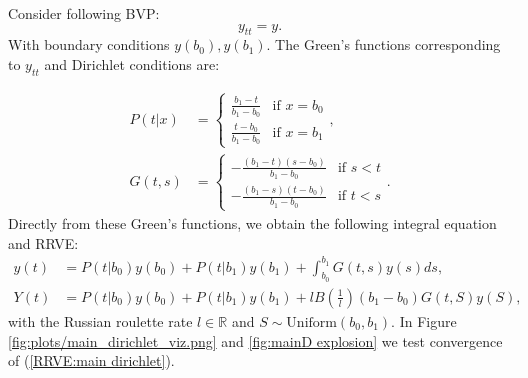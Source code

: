 \documentclass[a4paper,12pt]{article}
\begin{document}
\begin{example}[Dirichlet $y_{tt}=y$] \label{main dirichlet}
  Consider following BVP:
  \begin{equation} \label{eq:main dirichlet}
    y_{tt}=y.
  \end{equation}
  With boundary conditions $y(b_{0}),y(b_{1})$. The Green's functions corresponding to $y_{tt}$ and Dirichlet conditions are:

  \begin{align}
    P(t|x) & = \begin{cases}
                 \frac{b_{1}-t}{b_{1}-b_{0}} & \text{if } x = b_{0} \\
                 \frac{t-b_{0}}{b_{1}-b_{0}} & \text{if } x = b_{1}
               \end{cases},       \\
    G(t,s) & = \begin{cases}
                 -\frac{(b_{1}-t)(s-b_{0})}{b_{1}-b_{0}} & \text{if } s<t \\
                 -\frac{(b_{1}-s)(t-b_{0})}{b_{1}-b_{0}} & \text{if } t<s
               \end{cases}.
  \end{align}
  Directly from these Green's functions, we obtain the following integral equation and RRVE:
  \begin{align} \label{inteq:main dirichlet}
    y(t) & = P(t|b_{0}) y(b_{0}) + P(t|b_{1}) y(b_{1}) +
    \int_{b_{0}}^{b_{1}} G(t,s)y(s) ds,                  \\
    Y(t) & = P(t|b_{0}) y(b_{0}) + P(t|b_{1}) y(b_{1})
    + l B\left(\frac{1}{l} \right)(b_{1}-b_{0}) G(t,S)y(S) , \label{RRVE:main dirichlet}
  \end{align}
  with the Russian roulette rate $l \in \mathbb{R}$  and
  $S \sim \text{Uniform}(b_{0},b_{1})$. In Figure \ref{fig:plots/main_dirichlet_viz.png} and \ref{fig:mainD explosion}
  we test convergence of (\ref{RRVE:main dirichlet}).
\end{example}
\end{document}
